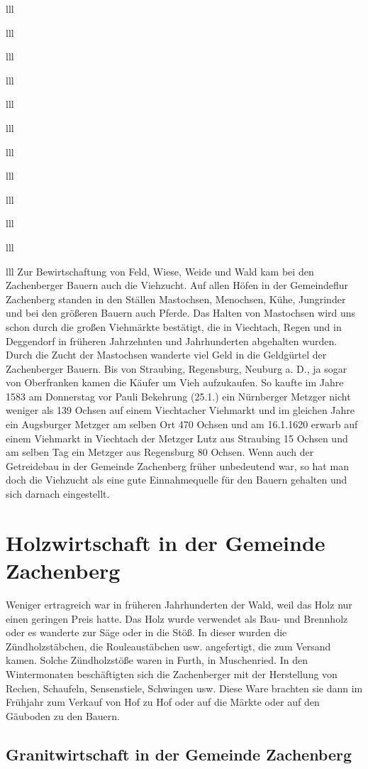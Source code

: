 \documentclass[12pt,a4pager]{book}
\begin{document}
\begin{tabuluar}{lll}
\begin{tabuluar}{lll}
\begin{tabuluar}{lll}
\begin{tabuluar}{lll}
\begin{tabuluar}{lll}
\begin{tabuluar}{lll}
\begin{tabuluar}{lll}
\begin{tabuluar}{lll}
\begin{tabuluar}{lll}
\begin{tabuluar}{lll}
\begin{tabuluar}{lll}
\begin{tabuluar}{lll}
Zur Bewirtschaftung von Feld, Wiese, Weide und Wald kam bei den Zachenberger
Bauern auch die Viehzucht. Auf allen Höfen in der Gemeindeflur Zachenberg
standen in den Ställen Mastochsen, Menochsen, Kühe, Jungrinder und bei den
größeren Bauern auch Pferde. Das Halten von Mastochsen wird uns schon durch die
großen Viehmärkte bestätigt, die in Viechtach, Regen und in Deggendorf in
früheren Jahrzehnten und Jahrhunderten abgehalten wurden. Durch die Zucht der
Mastochsen wanderte viel Geld in die Geldgürtel der Zachenberger Bauern. Bis von
Straubing, Regensburg, Neuburg a. D., ja sogar von Oberfranken kamen die Käufer
um Vieh aufzukaufen. So kaufte im Jahre 1583 am Donnerstag vor Pauli Bekehrung
(25.1.) ein Nürnberger Metzger nicht weniger als 139 Ochsen auf einem
Viechtacher Viehmarkt und im gleichen Jahre ein Augsburger Metzger am selben Ort
470 Ochsen und am 16.1.1620 erwarb auf einem Viehmarkt in Viechtach der Metzger
Lutz aus Straubing 15 Ochsen und am selben Tag ein Metzger aus Regensburg 80
Ochsen. Wenn auch der Getreidebau in der Gemeinde Zachenberg früher unbedeutend
war, so hat man doch die Viehzucht als eine gute Einnahmequelle für den Bauern
gehalten und sich darnach eingestellt.

\section{Holzwirtschaft in der Gemeinde Zachenberg}

Weniger ertragreich war in früheren Jahrhunderten der Wald, weil das Holz nur
einen geringen Preis hatte. Das Holz wurde verwendet als Bau- und Brennholz oder
es wanderte zur Säge oder in die Stöß. In dieser wurden die Zündholzstäbchen,
die Rouleaustäbchen usw. angefertigt, die zum Versand kamen. Solche
Zündholzstöße waren in Furth, in Muschenried. In den Wintermonaten beschäftigten
sich die Zachenberger mit der Herstellung von Rechen, Schaufeln, Sensenstiele,
Schwingen usw. Diese Ware brachten sie dann im Frühjahr zum Verkauf von Hof zu
Hof oder auf die Märkte oder auf den Gäuboden zu den Bauern.

\subsection{Granitwirtschaft in der Gemeinde Zachenberg}


\end{tabuluar}
\end{tabuluar}
\end{tabuluar}
\end{tabuluar}
\end{tabuluar}
\end{tabuluar}
\end{tabuluar}
\end{tabuluar}
\end{tabuluar}
\end{tabuluar}
\end{tabuluar}
\end{tabuluar}
\end{document}
